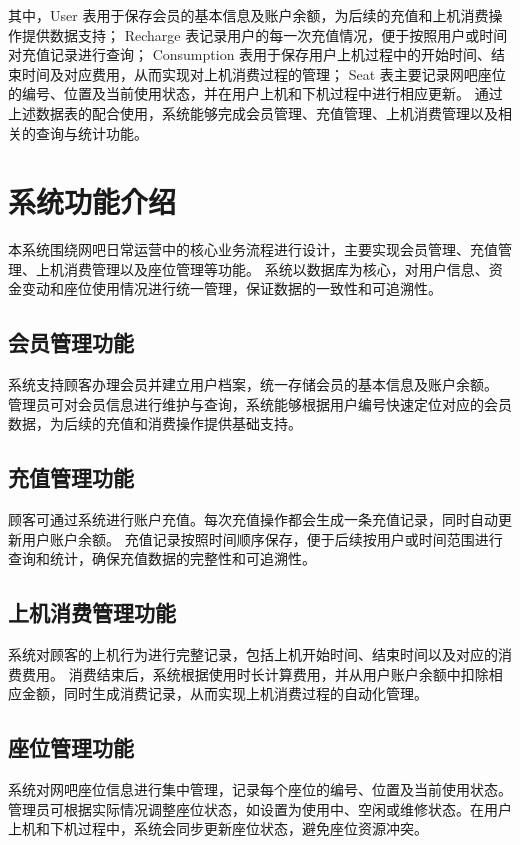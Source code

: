 \documentclass[12pt,a4paper]{article}
\begin{document}
其中，User 表用于保存会员的基本信息及账户余额，为后续的充值和上机消费操作提供数据支持；
Recharge 表记录用户的每一次充值情况，便于按照用户或时间对充值记录进行查询；
Consumption 表用于保存用户上机过程中的开始时间、结束时间及对应费用，从而实现对上机消费过程的管理；
Seat 表主要记录网吧座位的编号、位置及当前使用状态，并在用户上机和下机过程中进行相应更新。
通过上述数据表的配合使用，系统能够完成会员管理、充值管理、上机消费管理以及相关的查询与统计功能。

\section{系统功能介绍}
本系统围绕网吧日常运营中的核心业务流程进行设计，主要实现会员管理、充值管理、上机消费管理以及座位管理等功能。
系统以数据库为核心，对用户信息、资金变动和座位使用情况进行统一管理，保证数据的一致性和可追溯性。

\subsection{会员管理功能}
系统支持顾客办理会员并建立用户档案，统一存储会员的基本信息及账户余额。
管理员可对会员信息进行维护与查询，系统能够根据用户编号快速定位对应的会员数据，为后续的充值和消费操作提供基础支持。

\subsection{充值管理功能}
顾客可通过系统进行账户充值。每次充值操作都会生成一条充值记录，同时自动更新用户账户余额。
充值记录按照时间顺序保存，便于后续按用户或时间范围进行查询和统计，确保充值数据的完整性和可追溯性。

\subsection{上机消费管理功能}
系统对顾客的上机行为进行完整记录，包括上机开始时间、结束时间以及对应的消费费用。
消费结束后，系统根据使用时长计算费用，并从用户账户余额中扣除相应金额，同时生成消费记录，从而实现上机消费过程的自动化管理。

\subsection{座位管理功能}
系统对网吧座位信息进行集中管理，记录每个座位的编号、位置及当前使用状态。
管理员可根据实际情况调整座位状态，如设置为使用中、空闲或维修状态。在用户上机和下机过程中，系统会同步更新座位状态，避免座位资源冲突。
\end{document}

